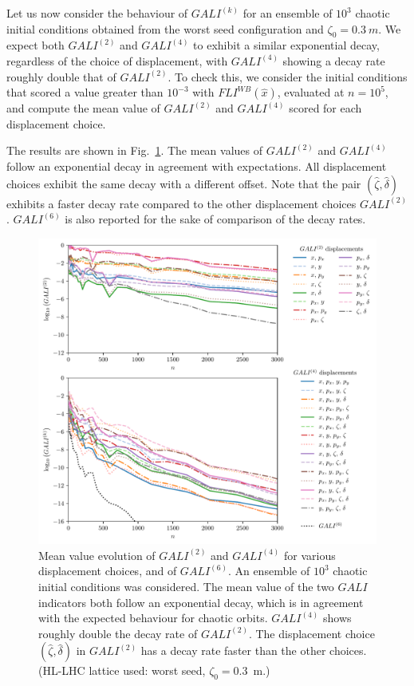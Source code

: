 Let us now consider the behaviour of $GALI^{(k)}$ for an ensemble of $10^3$ chaotic initial conditions obtained from the worst seed configuration and $\zeta_0=\SI{0.3}{m}$. We expect both $GALI^{(2)}$ and $GALI^{(4)}$ to exhibit a similar exponential decay, regardless of the choice of displacement, with $GALI^{(4)}$ showing a decay rate roughly double that of $GALI^{(2)}$. To check this, we consider the initial conditions that scored a value greater than $10^{-3}$ with $FLI^{WB}(\hat{x})$, evaluated at $n=10^{5}$, and compute the mean value of $GALI^{(2)}$ and $GALI^{(4)}$ scored for each displacement choice.

The results are shown in Fig.~\ref{fig:gali2_4_chaos}. The mean values of $GALI^{(2)}$ and $GALI^{(4)}$ follow an exponential decay in agreement with expectations. All displacement choices exhibit the same decay with a different offset. Note that the pair $(\hat{\zeta}, \hat{\delta})$ exhibits a faster decay rate compared to the other displacement choices $GALI^{(2)}$. $GALI^{(6)}$ is also reported for the sake of comparison of the decay rates.

\begin{figure}
    \centering
    \includegraphics[width=1.0\textwidth]{6_lhc_dynamic_indicators/figs/updated/evolution_gali_4_chaos.pdf}
    \caption{Mean value evolution of $GALI^{(2)}$ and $GALI^{(4)}$ for various displacement choices, and of $GALI^{(6)}$. An ensemble of $10^3$ chaotic initial conditions was considered. The mean value of the two $GALI$ indicators both follow an exponential decay, which is in agreement with the expected behaviour for chaotic orbits. $GALI^{(4)}$ shows roughly double the decay rate of $GALI^{(2)}$. The displacement choice $(\hat{\zeta}, \hat{\delta})$ in $GALI^{(2)}$ has a decay rate faster than the other choices. (HL-LHC lattice used: worst seed, $\zeta_0=$\SI{0.3}{\meter}.)}
    \label{fig:gali2_4_chaos}
\end{figure}


